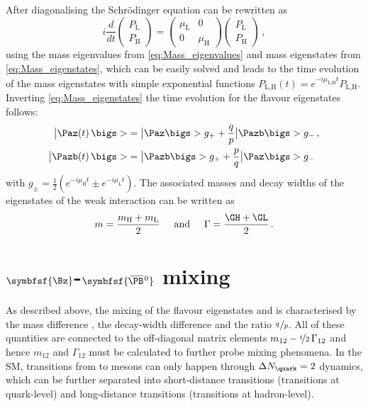 After diagonalising the Schrödinger equation can be rewritten as
\begin{equation}
i\frac{d}{d{}t}\begin{pmatrix} P_\text{L} \\ P_\text{H} \end{pmatrix} = \begin{pmatrix} \mu_\text{L} & 0 \\ 0 & \mu_\text{H} \end{pmatrix}\begin{pmatrix} P_\text{L} \\ P_\text{H} \end{pmatrix}\,,
\end{equation}
using the mass eigenvalues from \cref{eq:Mass_eigenvalues} and mass eigenstates from \cref{eq:Mass_eigenstates}, which can be easily solved and leads to the time evolution of the mass eigenstates with simple exponential functions $P_\text{L,H}(t)=e^{-i\mu_\text{L,H}t}P_\text{L,H}$.
Inverting \cref{eq:Mass_eigenstates} the time evolution for the flavour eigenstates follows:
\begin{equation}
\begin{split}
\big|\Paz\!\left(t\right)\bigs>&=\big|\Paz\bigs> g_++\frac{q}{p}\big|\Pazb\bigs>g_-\,,\\
\big|\Pazb\!\left(t\right)\bigs>&=\big|\Pazb\bigs>g_++\frac{p}{q}\big|\Paz\bigs>g_-\label{eq:timeEvolution}
\end{split}
\end{equation}
with $g_\pm=\frac{1}{2}\left(e^{-i\mu_\text{H}t}\pm e^{-i\mu_\text{L}t}\right)$.
The associated masses and decay widths of the eigenstates of the weak interaction can be written as
\begin{equation}
m=\frac{m_\text{H}+m_\text{L}}{2}\hspace{0.5cm}\text{and}\hspace{0.5cm}\Gamma=\frac{\GH+\GL}{2}\,.
\end{equation}

\section[head={\Bz-\Bzb mixing},tocentry={\Bz-\Bzb mixing}]{$\symbfsf{\Bz}$-$\symbfsf{\kern 0.2em\overline{\kern -0.25em \PB}{}^{\kern 0.1em 0}}$ mixing}
\label{sec:BBbarMixing}

As described above, the mixing of the flavour eigenstates \Bq and \Bqb is characterised by the mass difference \dm, the decay-width difference \DG and the ratio $\nicefrac{q\,}{p}$.
All of these quantities are connected to the off-diagonal matrix elements $m_{12}-\nicefrac{i}{2}\,\Gamma_{12}$ and hence $m_{12}$ and $\Gamma_{12}$ must be calculated to further probe mixing phenomena.
In the \ac{SM}, transitions from \Bq to \Bqb mesons can only happen through $\Delta N_\quark=2$ dynamics, which can be further separated into short-distance transitions (transitions at quark-level) and long-distance transitions (transitions at hadron-level).

